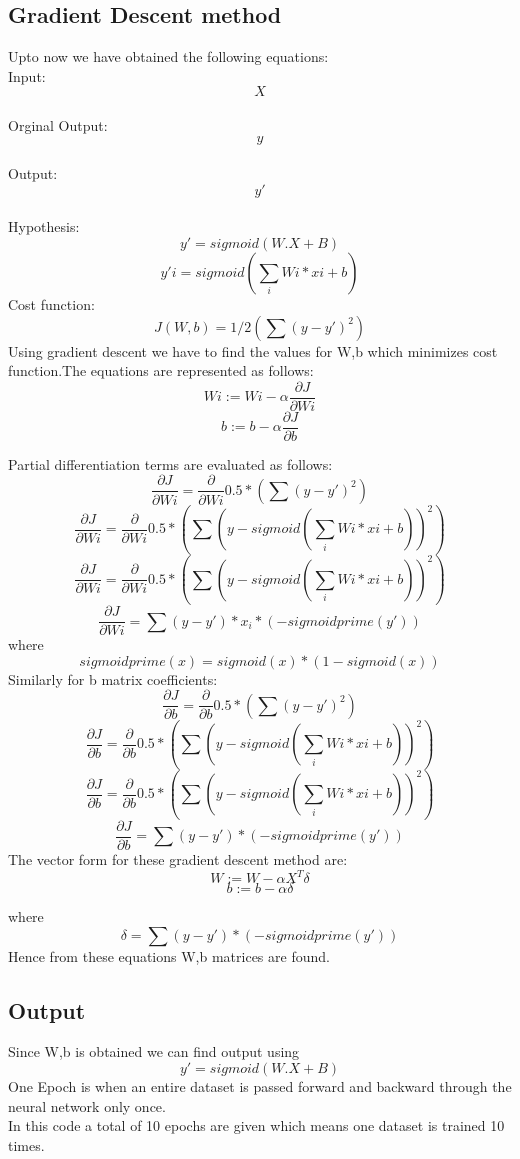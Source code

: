 \documentclass[12pt,letterpaper]{article}
\newcommand{\<}{\langle}
\renewcommand{\>}{\rangle}
\theoremstyle{definition}
\begin{document}
\subsection{Gradient Descent method}
Upto now we have obtained the following equations:\\
Input:$$X$$\\
Orginal Output:$$y$$\\
Output:$$y'$$\\
Hypothesis:$$y'= sigmoid(W.X + B)$$ 
$$y'i=sigmoid(\sum_{i} Wi*xi + b)$$
Cost function:$$J(W,b)=1/2(\sum (y-y')^2)$$Using gradient descent we have to find the values for W,b which minimizes cost function.The equations are represented as follows:
$$Wi:=Wi-\alpha\frac{\partial J}{\partial Wi}$$
$$b:=b-\alpha\frac{\partial J}{\partial b}$$


Partial differentiation terms are evaluated as follows:\\
$$\frac{\partial J}{\partial Wi}=\frac{\partial  }{\partial Wi}0.5*(\sum (y-y')^2)$$
$$\frac{\partial J}{\partial Wi}=\frac{\partial  }{\partial Wi}0.5*(\sum (y-sigmoid(\sum_{i} Wi*xi + b))^2)$$
$$\frac{\partial J}{\partial Wi}=\frac{\partial  }{\partial Wi}0.5*(\sum (y-sigmoid(\sum_{i} Wi*xi + b))^2)$$
$$\frac{\partial J}{\partial Wi}=\sum (y-y')*x_i*(-sigmoidprime(y'))$$
where 
$$sigmoidprime(x)=sigmoid(x)*(1-sigmoid(x))$$Similarly for b matrix coefficients:
$$\frac{\partial J}{\partial b}=\frac{\partial  }{\partial b}0.5*(\sum (y-y')^2)$$
$$\frac{\partial J}{\partial b}=\frac{\partial  }{\partial b}0.5*(\sum (y-sigmoid(\sum_{i} Wi*xi + b))^2)$$
$$\frac{\partial J}{\partial b}=\frac{\partial  }{\partial b}0.5*(\sum (y-sigmoid(\sum_{i} Wi*xi + b))^2)$$
$$\frac{\partial J}{\partial b}=\sum (y-y')*(-sigmoidprime(y'))$$The vector form for these gradient descent method are:
$$W:=W-\alpha X^T\delta$$
$$b:=b-\alpha \delta$$

where $$\delta=\sum (y-y')*(-sigmoidprime(y'))$$Hence from these equations W,b matrices are found.

\subsection{Output}
Since W,b is obtained we can find output using $$y'= sigmoid(W.X + B)$$One Epoch is when an entire dataset is passed forward and backward through the neural network only once.\\
In this code a total of 10 epochs are given which means one dataset is trained 10 times.
\end{document}
